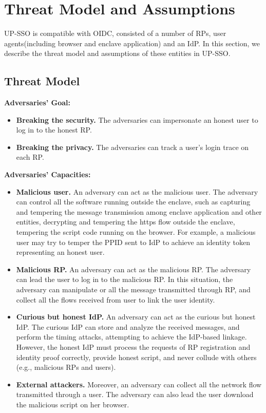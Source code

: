\section{Threat Model and Assumptions}
\label{sec:threatmodel}
UP-SSO is compatible with OIDC, consisted of a number of RPs, user agents(including browser and enclave application) and an IdP. In this section, we describe the threat model and assumptions of these entities in UP-SSO.
\subsection{Threat Model}
\noindent\textbf{Adversaries' Goal: } 
\begin{itemize}
\item \noindent\textbf{Breaking the security. }The adversaries can impersonate an honest user to log in to the honest RP.
\item \noindent\textbf{Breaking the privacy. }The adversaries can track a user's login trace on each RP.
\end{itemize} 

\noindent\textbf{Adversaries' Capacities: }
\begin{itemize}
\item \noindent\textbf{Malicious user. }An adversary can act as the malicious user. The adversary can control all the software running outside the enclave, such as capturing and tempering the message transmission among enclave application and other entities, decrypting and tempering the https flow outside the enclave, tempering the script code running on the browser. For example, a malicious user may try to temper the PPID sent to IdP to achieve an identity token representing an honest user. 
\item \noindent\textbf{Malicious RP. }An adversary can act as the malicious RP. The adversary can lead the user to log in to the malicious RP. In this situation, the adversary can manipulate or all the message transmitted through RP, and collect all the flows received from user to link the user identity. 
\item \noindent\textbf{Curious but honest IdP. }An adversary can act as the curious but honest IdP. The curious IdP can store and analyze the received messages, and perform the timing attacks, attempting to achieve the IdP-based linkage. However, the honest IdP must process the requests of RP registration and identity proof correctly, provide honest script, and never collude with others (e.g., malicious RPs and users).
\item \noindent\textbf{External attackers. }Moreover, an adversary can collect all the network flow transmitted through a user. The adversary can also lead the user download the malicious script on her browser.
\end{itemize}

